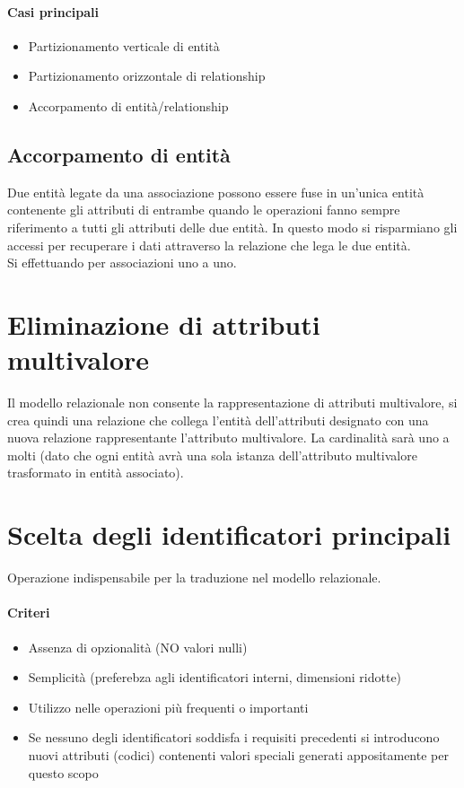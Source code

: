 \paragraph*{Casi principali}
\begin{itemize}
    \item Partizionamento verticale di entità
    \item Partizionamento orizzontale di relationship
    \item Accorpamento di entità/relationship
\end{itemize}
\subsection{Accorpamento di entità}
Due entità legate da una associazione possono essere fuse in un'unica entità
contenente gli attributi di entrambe quando le operazioni fanno sempre riferimento a tutti gli 
attributi delle due entità. In questo modo si risparmiano gli accessi per recuperare i dati
attraverso la relazione che lega le due entità.\\
Si effettuando per associazioni uno a uno.
\section{Eliminazione di attributi multivalore}
Il modello relazionale non consente la rappresentazione di attributi multivalore, si crea quindi
una relazione che collega l'entità dell'attributi designato con una nuova relazione rappresentante 
l'attributo multivalore. La cardinalità sarà uno a molti (dato che ogni entità avrà una sola
istanza dell'attributo multivalore trasformato in entità associato).
\section{Scelta degli identificatori principali}
Operazione indispensabile per la traduzione nel modello relazionale.
\paragraph*{Criteri}
\begin{itemize}
    \item Assenza di opzionalità (NO valori nulli)
    \item Semplicità (preferebza agli identificatori interni, dimensioni ridotte)
    \item Utilizzo nelle operazioni più frequenti o importanti
    \item Se nessuno degli identificatori soddisfa i requisiti precedenti si introducono
    nuovi attributi (codici) contenenti valori speciali generati appositamente per questo scopo
\end{itemize}
